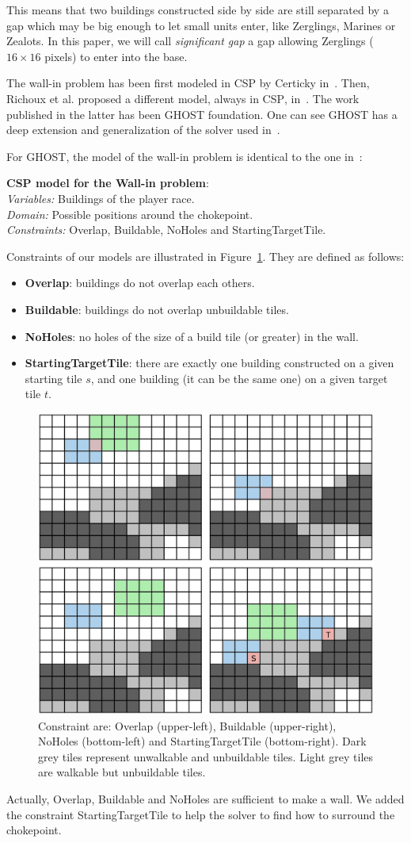 \documentclass{article}
\newcommand{\csp}{\textsc{CSP}\xspace}
\newcommand{\ghost}{\textsc{GHOST}\xspace}
\newcommand{\modelcsp}[4]%
{ \begin{trivlist}
  \item[]%
    \textbf{CSP model for #1}:\\
    \textit{Variables:} #2\\
    \textit{Domain:} #3\\
    \textit{Constraints:} #4
  \end{trivlist}%
}
\begin{document}
This  means that  two buildings  constructed  side by  side are  still
separated by a gap  which may be big enough to  let small units enter,
like Zerglings, Marines  or Zealots. In this paper, we  will call {\it
  significant gap} a gap allowing Zerglings ($16 \times 16$ pixels) to
enter into the base.

The  wall-in  problem has  been  first  modeled  in \csp  by  Certicky
in~\cite{Certicky13}. Then, Richoux et al. proposed a different model,
always  in \csp,  in~\cite{RichouxUO14}.   The work  published in  the
latter has  been \ghost  foundation.  One  can see  \ghost has  a deep
extension and generalization of the solver used in~\cite{RichouxUO14}.

For \ghost, the  model of the wall-in problem is  identical to the one
in~\cite{RichouxUO14}:
\modelcsp{the Wall-in problem}%
{Buildings of the player race.}%
{Possible positions around the chokepoint.}%
{Overlap, Buildable, NoHoles and StartingTargetTile.}

Constraints     of      our     models     are      illustrated     in
Figure~\ref{fig:wall_constraint}. They are defined as follows:
\begin{itemize}
\item {\bf Overlap}: buildings do not overlap each others.
\item {\bf Buildable}: buildings do not overlap unbuildable tiles.
\item {\bf NoHoles}: no holes of the size of a build tile (or greater)
  in the wall.
\item  {\bf  StartingTargetTile}:  there   are  exactly  one  building
  constructed on a  given starting tile $s$, and one  building (it can
  be the same one) on a given target tile $t$.
\end{itemize}
\begin{figure}[tb]
  \centering
  \includegraphics[width=0.6\linewidth]{figs/all_constraints.png}
  \caption{Constraint    are:    Overlap    (upper-left),    Buildable
    (upper-right),   NoHoles   (bottom-left)  and   StartingTargetTile
    (bottom-right).    Dark  grey   tiles  represent   unwalkable  and
    unbuildable tiles.  Light grey  tiles are walkable but unbuildable
    tiles.}
  \label{fig:wall_constraint}
\end{figure}
Actually,  Overlap, Buildable  and NoHoles  are sufficient  to make  a
wall. We added the constraint StartingTargetTile to help the solver to
find how to surround the chokepoint.
\end{document}
